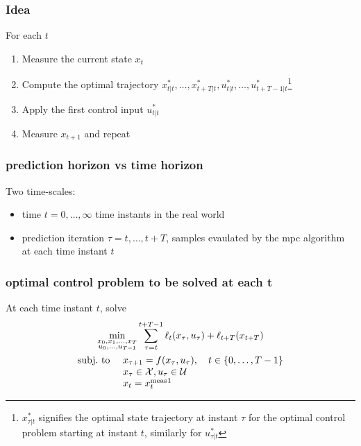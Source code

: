 \documentclass{book}
\theoremstyle{definition}
\theoremstyle{remark}
\theoremstyle{remark}
\begin{document}
\subsubsection{Idea} %
For each $t$
\begin{enumerate}
    \item Measure the current state $x_t$ 
    \item Compute the optimal trajectory $x^*_{t|t},\dots,x^*_{t+T|t},u^*_{t|t},\dots,u^*_{t+T-1|t}$\footnote{$x^*_{\tau|t}$ signifies the optimal state trajectory at instant $\tau$ for the optimal control problem starting at instant $t$, similarly for $u^*_{\tau|t}$}
    \item Apply the first control input $u^*_{t|t}$
    \item Measure $x_{t+1}$ and repeat
\end{enumerate}
\subsubsection{prediction horizon vs time horizon}
Two time-scales: 
\begin{itemize}
    \item time $t=0,\dots,\infty$ time instants in the real world 
    \item prediction iteration $\tau=t,\dots,t+T$, samples evaulated by the mpc algorithm at each time instant $t$
\end{itemize}
\subsubsection{optimal control problem to be solved at each t}
At each time instant $t$, solve 
\begin{gather*}
    \min_{\substack{x_0,x_1,\dots,x_T\\u_0,\dots,u_{T-1}}} \displaystyle\sum_{\tau=t}^{t+T-1}\ell_t(x_\tau,u_\tau)+\ell_{t+T}(x_{t+T})\\
    \begin{array}{l l }
        \text{subj.\ to } & x_{\tau+1}=f(x_\tau,u_\tau), \quad t\in\{0,\dots,T-1\}\\
                         & x_\tau \in \mathcal{X}, u_\tau \in \mathcal{U}  \\
                         & x_t = x_t^{\text{meas}}\text{\footnotemark}
    \end{array}
\end{gather*}
\end{document}
